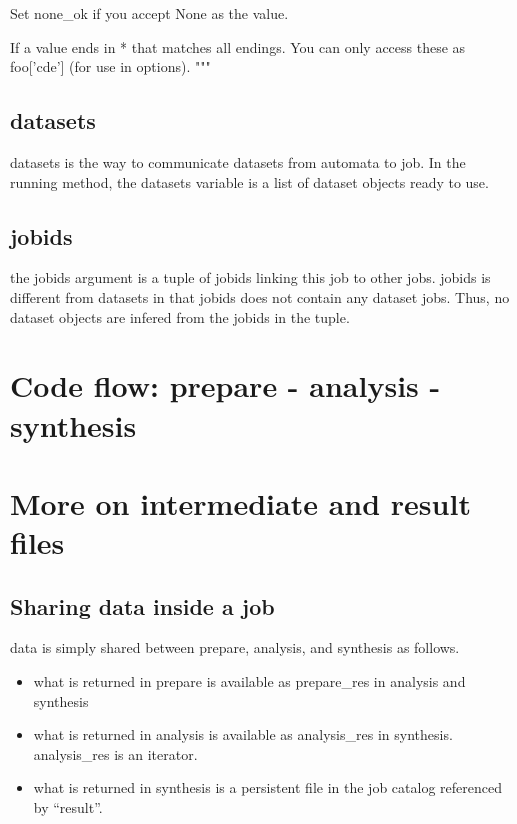 \begin{python}
    Set none_ok if you accept None as the value.                                                                                                                                                                                  
                                                                                                                                                                                                                                  
    If a value ends in * that matches all endings. You can only access                                                                                                                                                            
    these as foo['cde'] (for use in options{}).                                                                                                                                                                                   
    """
\end{python}

\subsection{datasets}
datasets is the way to communicate datasets from automata to job.  In
the running method, the datasets variable is a list of dataset objects
ready to use.

\subsection{jobids}
the jobids argument is a tuple of jobids linking this job to other
jobs.  jobids is different from datasets in that jobids does not
contain any dataset jobs.  Thus, no dataset objects are infered from
the jobids in the tuple.



\section{Code flow:  prepare - analysis - synthesis}

\section{More on intermediate and result files}

\subsection{Sharing data inside a job}
data is simply shared between prepare, analysis, and synthesis as follows.
\begin{itemize}
\item what is returned in prepare is available as prepare_res in analysis and synthesis
\item what is returned in analysis is available as analysis_res in synthesis.  analysis_res is an iterator.
\item what is returned in synthesis is a persistent file in the job catalog referenced by ``result''.
\end{itemize}

